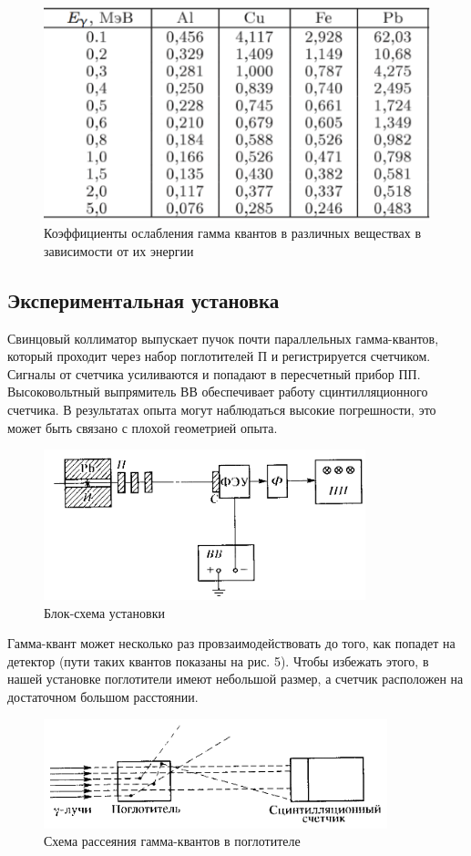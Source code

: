 \documentclass[a4paper,12pt]{article}
\theoremstyle{plain} %
\theoremstyle{definition} %
\theoremstyle{remark} %
\begin{document}
\begin{figure}[h]
    \centering
    \includegraphics[width=0.5 \textwidth]{img3.png}
    \caption{Коэффициенты ослабления гамма квантов в различных веществах в зависимости от их энергии}
    \label{fig:my_label}
\end{figure}

\subsection{Экспериментальная установка}

Свинцовый коллиматор выпускает пучок почти параллельных гамма-квантов, который проходит через набор поглотителей П и регистрируется счетчиком. Сигналы от счетчика усиливаются и попадают в пересчетный прибор ПП. Высоковольтный выпрямитель ВВ обеспечивает работу сцинтилляционного счетчика. В результатах опыта могут наблюдаться высокие погрешности, это может быть связано с плохой геометрией опыта. 
\begin{figure}[h]
    \centering
    \includegraphics[width=0.5 \textwidth]{img4.png}
    \caption{Блок-схема установки}
    \label{fig:my_label}
\end{figure}
\newpage
Гамма-квант может несколько раз провзаимодействовать до того, как попадет на детектор (пути таких квантов показаны на рис. 5). Чтобы избежать этого, в нашей установке поглотители имеют небольшой размер, а счетчик расположен на достаточном большом расстоянии. 
\begin{figure}[h]
    \centering
    \includegraphics[width=0.5 \textwidth]{img5.png}
    \caption{Схема рассеяния гамма-квантов в поглотителе}
    \label{fig:my_label}
\end{figure}
\end{document}
